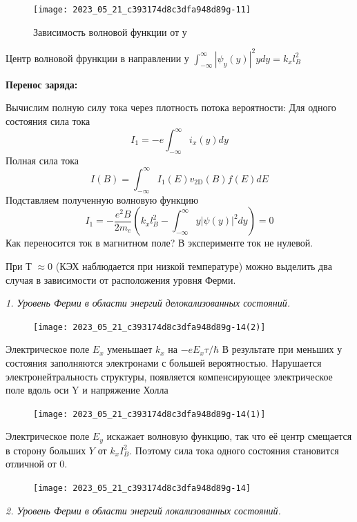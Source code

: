 \begin{figure}[h!]
    \centering
    \texttt{[image: 2023\_05\_21\_c393174d8c3dfa948d89g-11]}
    \caption*{Зависимость волновой функции от у}
\end{figure}

Центр волновой фрункции в направлении у
$
\int_{-\infty}^{\infty}\left|\psi_{y}(y)\right|^{2} y d y=k_{x} l_{B}^{2}
$


\textbf{Перенос заряда:}

Вычислим полную силу тока через плотность потока вероятности:
Для одного состояния сила тока
$$
I_1=-e \int_{-\infty}^{\infty} i_x(y) d y
$$
Полная сила тока
$$
I(B)=\int_{-\infty}^{\infty} I_1(E) v_{2 \mathrm{D}}(B) f(E) d E
$$
Подставляем полученную волновую функцию
$$
I_1=-\frac{e^2 B}{2 m_e}\left(k_x l_B^2-\int_{-\infty}^{\infty} y|\psi(y)|^2 d y\right)=0
$$
Как переносится ток в магнитном поле? В эксперименте ток не нулевой.


При Т $\approx 0$ (КЭХ наблюдается при низкой температуре) можно выделить два случая в зависимости от расположения уровня Ферми.

\textit{1. Уровень Ферми в области энергий делокализованных состояний.}

\begin{figure}[h!]
    \centering
    \texttt{[image: 2023\_05\_21\_c393174d8c3dfa948d89g-14(2)]}
\end{figure}

Электрическое поле $E_{x}$ уменьшает $k_{x}$ на $-e E_{x} \tau / \hbar$ В результате при меньших у состояния заполняются электронами с большей вероятностью. Нарушается
электронейтральность структуры, появляется компенсирующее электрическое поле вдоль оси Y и напряжение Холла

\begin{figure}[h!]
    \centering
    \texttt{[image: 2023\_05\_21\_c393174d8c3dfa948d89g-14(1)]}
\end{figure}

Электрическое поле $E_{y}$ искажает волновую функцию, так что её центр смещается в сторону больших $Y$ от $k_{x} I_{B}^{2}$. Поэтому сила тока одного состояния становится отличной от 0.
\begin{figure}[h!]
    \centering
    \texttt{[image: 2023\_05\_21\_c393174d8c3dfa948d89g-14]}
\end{figure}


\textit{2. Уровень Ферми в области энергий локализованных состояний.}


